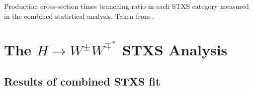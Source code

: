 \begin{table}
    \caption{Production cross-section times \HWW branching ratio in each STXS category measured in the combined statistical analysis. Taken from .}
    \label{fig:stxs-xsec-uncertainties}
\end{table}


\section{The $H\rightarrow W^{\pm}W^{\mp^*}$ STXS Analysis}
\subsection{Results of combined STXS fit}
